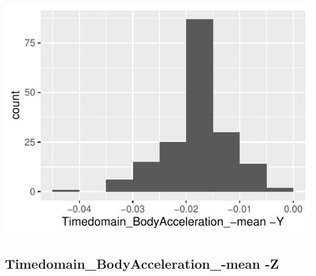 \documentclass[
]{article}
\begin{document}
\begin{minipage}{0.25 \textwidth}

\includegraphics{codebook_tidydatasub_files/figure-latex/Var-4-Timedomain-BodyAcceleration--mean--Y-1.pdf}

\end{minipage}

\noindent\makebox[\linewidth]{\rule{\textwidth}{0.4pt}}

\hypertarget{timedomain_bodyacceleration_-mean--z}{%
\subsection{Timedomain\_BodyAcceleration\_-mean
-Z}\label{timedomain_bodyacceleration_-mean--z}}
\end{document}
